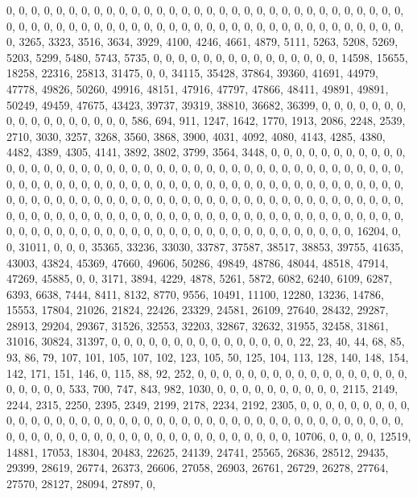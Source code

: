 \documentclass[
]{article}
\begin{document}
0, 0, 0, 0, 0, 0, 0, 0, 0, 0, 0, 0, 0, 0, 0, 0, 0, 0, 0, 0, 0, 0, 0, 0,
0, 0, 0, 0, 0, 0, 0, 0, 0, 0, 0, 0, 0, 0, 0, 0, 0, 0, 0, 0, 0, 0, 0, 0,
0, 0, 0, 0, 0, 0, 0, 0, 0, 0, 0, 0, 0, 0, 0, 0, 0, 3265, 3323, 3516,
3634, 3929, 4100, 4246, 4661, 4879, 5111, 5263, 5208, 5269, 5203, 5299,
5480, 5743, 5735, 0, 0, 0, 0, 0, 0, 0, 0, 0, 0, 0, 0, 0, 0, 0, 14598,
15655, 18258, 22316, 25813, 31475, 0, 0, 34115, 35428, 37864, 39360,
41691, 44979, 47778, 49826, 50260, 49916, 48151, 47916, 47797, 47866,
48411, 49891, 49891, 50249, 49459, 47675, 43423, 39737, 39319, 38810,
36682, 36399, 0, 0, 0, 0, 0, 0, 0, 0, 0, 0, 0, 0, 0, 0, 0, 0, 0, 586,
694, 911, 1247, 1642, 1770, 1913, 2086, 2248, 2539, 2710, 3030, 3257,
3268, 3560, 3868, 3900, 4031, 4092, 4080, 4143, 4285, 4380, 4482, 4389,
4305, 4141, 3892, 3802, 3799, 3564, 3448, 0, 0, 0, 0, 0, 0, 0, 0, 0, 0,
0, 0, 0, 0, 0, 0, 0, 0, 0, 0, 0, 0, 0, 0, 0, 0, 0, 0, 0, 0, 0, 0, 0, 0,
0, 0, 0, 0, 0, 0, 0, 0, 0, 0, 0, 0, 0, 0, 0, 0, 0, 0, 0, 0, 0, 0, 0, 0,
0, 0, 0, 0, 0, 0, 0, 0, 0, 0, 0, 0, 0, 0, 0, 0, 0, 0, 0, 0, 0, 0, 0, 0,
0, 0, 0, 0, 0, 0, 0, 0, 0, 0, 0, 0, 0, 0, 0, 0, 0, 0, 0, 0, 0, 0, 0, 0,
0, 0, 0, 0, 0, 0, 0, 0, 0, 0, 0, 0, 0, 0, 0, 0, 0, 0, 0, 0, 0, 0, 0, 0,
0, 0, 0, 0, 0, 0, 0, 0, 0, 0, 0, 0, 0, 0, 0, 0, 0, 0, 0, 0, 0, 0, 0, 0,
0, 0, 0, 0, 0, 0, 0, 0, 0, 0, 0, 0, 0, 16204, 0, 0, 31011, 0, 0, 0,
35365, 33236, 33030, 33787, 37587, 38517, 38853, 39755, 41635, 43003,
43824, 45369, 47660, 49606, 50286, 49849, 48786, 48044, 48518, 47914,
47269, 45885, 0, 0, 3171, 3894, 4229, 4878, 5261, 5872, 6082, 6240,
6109, 6287, 6393, 6638, 7444, 8411, 8132, 8770, 9556, 10491, 11100,
12280, 13236, 14786, 15553, 17804, 21026, 21824, 22426, 23329, 24581,
26109, 27640, 28432, 29287, 28913, 29204, 29367, 31526, 32553, 32203,
32867, 32632, 31955, 32458, 31861, 31016, 30824, 31397, 0, 0, 0, 0, 0,
0, 0, 0, 0, 0, 0, 0, 0, 0, 0, 22, 23, 40, 44, 68, 85, 93, 86, 79, 107,
101, 105, 107, 102, 123, 105, 50, 125, 104, 113, 128, 140, 148, 154,
142, 171, 151, 146, 0, 115, 88, 92, 252, 0, 0, 0, 0, 0, 0, 0, 0, 0, 0,
0, 0, 0, 0, 0, 0, 0, 0, 0, 0, 0, 0, 533, 700, 747, 843, 982, 1030, 0, 0,
0, 0, 0, 0, 0, 0, 0, 0, 2115, 2149, 2244, 2315, 2250, 2395, 2349, 2199,
2178, 2234, 2192, 2305, 0, 0, 0, 0, 0, 0, 0, 0, 0, 0, 0, 0, 0, 0, 0, 0,
0, 0, 0, 0, 0, 0, 0, 0, 0, 0, 0, 0, 0, 0, 0, 0, 0, 0, 0, 0, 0, 0, 0, 0,
0, 0, 0, 0, 0, 0, 0, 0, 0, 0, 0, 0, 0, 0, 0, 0, 0, 0, 0, 0, 0, 0, 0, 0,
10706, 0, 0, 0, 0, 12519, 14881, 17053, 18304, 20483, 22625, 24139,
24741, 25565, 26836, 28512, 29435, 29399, 28619, 26774, 26373, 26606,
27058, 26903, 26761, 26729, 26278, 27764, 27570, 28127, 28094, 27897, 0,
\end{document}
